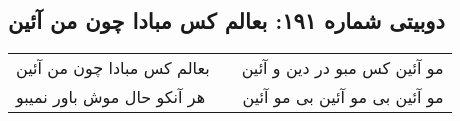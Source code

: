 \begin{center}
\section*{دوبیتی شماره ۱۹۱: بعالم کس مبادا چون من آئین}
\label{sec:191}
\begin{longtable}{l p{0.5cm} r}
بعالم کس مبادا چون من آئین
&&
مو آئین کس مبو در دین و آئین
\\
هر آنکو حال موش باور نمیبو
&&
مو آئین بی مو آئین بی مو آئین
\\
\end{longtable}
\end{center}
